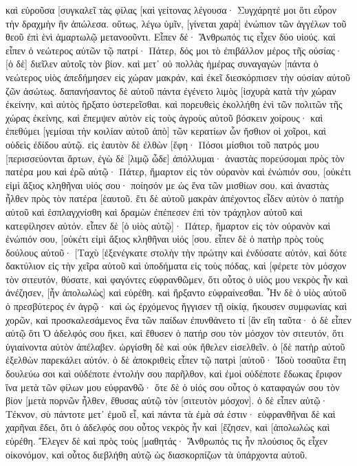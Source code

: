 καὶ εὑροῦσα [συγκαλεῖ τὰς φίλας [καὶ γείτονας λέγουσα· Συγχάρητέ μοι ὅτι εὗρον τὴν δραχμὴν ἣν ἀπώλεσα. 
οὕτως, λέγω ὑμῖν, [γίνεται χαρὰ] ἐνώπιον τῶν ἀγγέλων τοῦ θεοῦ ἐπὶ ἑνὶ ἁμαρτωλῷ μετανοοῦντι. 
Εἶπεν δέ· Ἄνθρωπός τις εἶχεν δύο υἱούς. 
καὶ εἶπεν ὁ νεώτερος αὐτῶν τῷ πατρί· Πάτερ, δός μοι τὸ ἐπιβάλλον μέρος τῆς οὐσίας· [ὁ δὲ] διεῖλεν αὐτοῖς τὸν βίον. 
καὶ μετ᾽ οὐ πολλὰς ἡμέρας συναγαγὼν [πάντα ὁ νεώτερος υἱὸς ἀπεδήμησεν εἰς χώραν μακράν, καὶ ἐκεῖ διεσκόρπισεν τὴν οὐσίαν αὐτοῦ ζῶν ἀσώτως. 
δαπανήσαντος δὲ αὐτοῦ πάντα ἐγένετο λιμὸς [ἰσχυρὰ κατὰ τὴν χώραν ἐκείνην, καὶ αὐτὸς ἤρξατο ὑστερεῖσθαι. 
καὶ πορευθεὶς ἐκολλήθη ἑνὶ τῶν πολιτῶν τῆς χώρας ἐκείνης, καὶ ἔπεμψεν αὐτὸν εἰς τοὺς ἀγροὺς αὐτοῦ βόσκειν χοίρους· 
καὶ ἐπεθύμει [γεμίσαι τὴν κοιλίαν αὐτοῦ ἀπὸ] τῶν κερατίων ὧν ἤσθιον οἱ χοῖροι, καὶ οὐδεὶς ἐδίδου αὐτῷ. 
εἰς ἑαυτὸν δὲ ἐλθὼν [ἔφη· Πόσοι μίσθιοι τοῦ πατρός μου [περισσεύονται ἄρτων, ἐγὼ δὲ [λιμῷ ὧδε] ἀπόλλυμαι· 
ἀναστὰς πορεύσομαι πρὸς τὸν πατέρα μου καὶ ἐρῶ αὐτῷ· Πάτερ, ἥμαρτον εἰς τὸν οὐρανὸν καὶ ἐνώπιόν σου, 
[οὐκέτι εἰμὶ ἄξιος κληθῆναι υἱός σου· ποίησόν με ὡς ἕνα τῶν μισθίων σου. 
καὶ ἀναστὰς ἦλθεν πρὸς τὸν πατέρα [ἑαυτοῦ. ἔτι δὲ αὐτοῦ μακρὰν ἀπέχοντος εἶδεν αὐτὸν ὁ πατὴρ αὐτοῦ καὶ ἐσπλαγχνίσθη καὶ δραμὼν ἐπέπεσεν ἐπὶ τὸν τράχηλον αὐτοῦ καὶ κατεφίλησεν αὐτόν. 
εἶπεν δὲ [ὁ υἱὸς αὐτῷ]· Πάτερ, ἥμαρτον εἰς τὸν οὐρανὸν καὶ ἐνώπιόν σου, [οὐκέτι εἰμὶ ἄξιος κληθῆναι υἱός [σου. 
εἶπεν δὲ ὁ πατὴρ πρὸς τοὺς δούλους αὐτοῦ· [Ταχὺ [ἐξενέγκατε στολὴν τὴν πρώτην καὶ ἐνδύσατε αὐτόν, καὶ δότε δακτύλιον εἰς τὴν χεῖρα αὐτοῦ καὶ ὑποδήματα εἰς τοὺς πόδας, 
καὶ [φέρετε τὸν μόσχον τὸν σιτευτόν, θύσατε, καὶ φαγόντες εὐφρανθῶμεν, 
ὅτι οὗτος ὁ υἱός μου νεκρὸς ἦν καὶ ἀνέζησεν, [ἦν ἀπολωλὼς] καὶ εὑρέθη. καὶ ἤρξαντο εὐφραίνεσθαι. 
Ἦν δὲ ὁ υἱὸς αὐτοῦ ὁ πρεσβύτερος ἐν ἀγρῷ· καὶ ὡς ἐρχόμενος ἤγγισεν τῇ οἰκίᾳ, ἤκουσεν συμφωνίας καὶ χορῶν, 
καὶ προσκαλεσάμενος ἕνα τῶν παίδων ἐπυνθάνετο τί [ἂν εἴη ταῦτα· 
ὁ δὲ εἶπεν αὐτῷ ὅτι Ὁ ἀδελφός σου ἥκει, καὶ ἔθυσεν ὁ πατήρ σου τὸν μόσχον τὸν σιτευτόν, ὅτι ὑγιαίνοντα αὐτὸν ἀπέλαβεν. 
ὠργίσθη δὲ καὶ οὐκ ἤθελεν εἰσελθεῖν. ὁ [δὲ πατὴρ αὐτοῦ ἐξελθὼν παρεκάλει αὐτόν. 
ὁ δὲ ἀποκριθεὶς εἶπεν τῷ πατρὶ [αὐτοῦ· Ἰδοὺ τοσαῦτα ἔτη δουλεύω σοι καὶ οὐδέποτε ἐντολήν σου παρῆλθον, καὶ ἐμοὶ οὐδέποτε ἔδωκας ἔριφον ἵνα μετὰ τῶν φίλων μου εὐφρανθῶ· 
ὅτε δὲ ὁ υἱός σου οὗτος ὁ καταφαγών σου τὸν βίον [μετὰ πορνῶν ἦλθεν, ἔθυσας αὐτῷ τὸν [σιτευτὸν μόσχον]. 
ὁ δὲ εἶπεν αὐτῷ· Τέκνον, σὺ πάντοτε μετ᾽ ἐμοῦ εἶ, καὶ πάντα τὰ ἐμὰ σά ἐστιν· 
εὐφρανθῆναι δὲ καὶ χαρῆναι ἔδει, ὅτι ὁ ἀδελφός σου οὗτος νεκρὸς ἦν καὶ [ἔζησεν, καὶ [ἀπολωλὼς καὶ εὑρέθη. 
Ἔλεγεν δὲ καὶ πρὸς τοὺς [μαθητάς· Ἄνθρωπός τις ἦν πλούσιος ὃς εἶχεν οἰκονόμον, καὶ οὗτος διεβλήθη αὐτῷ ὡς διασκορπίζων τὰ ὑπάρχοντα αὐτοῦ. 
